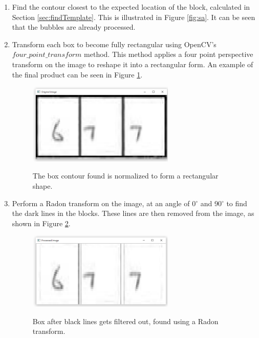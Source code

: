 \begin{enumerate}
\item Find the contour closest to the expected location of the block, calculated in Section \ref{sec:findTemplate}. This is illustrated in Figure \ref{fig:sa}. It can be seen that the bubbles are already processed.

\item Transform each box to become fully rectangular using OpenCV's $four\_point\_transform$ method. This method applies a four point perspective transform on the image to reshape it into a rectangular form. An example of the final product can be seen in Figure \ref{fig:bp}.

\begin{figure}
  \centering
  \includegraphics[width=7cm]{BeforeProcessing}\\
  \caption{The box contour found is normalized to form a rectangular shape.}
  \label{fig:bp}
\end{figure}

\item Perform a Radon transform on the image, at an angle of 0$^{\circ}$ and 90$^{\circ}$ to find the dark lines in the blocks. These lines are then removed from the image, as shown in Figure \ref{fig:ar}. 

\begin{figure}
  \centering
  \includegraphics[width=7cm]{AfterRadon}\\
  \caption{Box after black lines gets filtered out, found using a Radon transform.}
  \label{fig:ar}
\end{figure}


\end{enumerate}
